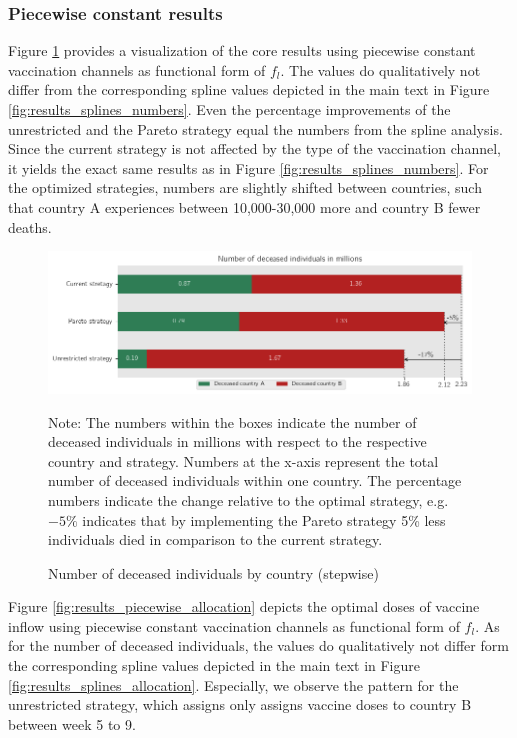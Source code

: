 \subsubsection{Piecewise constant results}
\label{A:piecewise}
Figure \ref{fig:results_piecewise_numbers} provides a visualization of the core results using piecewise constant vaccination channels as functional form of $f_l$. The values do qualitatively not differ from the corresponding spline values depicted in the main text in Figure \ref{fig:results_splines_numbers}. Even the percentage improvements of the unrestricted and the Pareto strategy equal the numbers from the spline analysis. Since the current strategy is not affected by the type of the vaccination channel, it yields the exact same results as in Figure \ref{fig:results_splines_numbers}. For the optimized strategies, numbers are slightly shifted between countries, such that country A experiences between 10,000-30,000 more and country B fewer deaths. 
\begin{figure}[h!]
\centering
\includegraphics[scale=0.65]{images/piecewise_percentage_deviation.png}
\begin{flushleft}
\scriptsize{Note: The numbers within the boxes indicate the number of deceased individuals in millions with respect to the respective country and strategy. Numbers at the x-axis represent the total number of deceased individuals within one country. The percentage numbers indicate the change relative to the optimal strategy, e.g. $-5\%$ indicates that by implementing the Pareto strategy 5\% less individuals died in comparison to the current strategy.}
\end{flushleft}
\caption{Number of deceased individuals by country (stepwise)}
\label{fig:results_piecewise_numbers}
\end{figure}
Figure \ref{fig:results_piecewise_allocation} depicts the optimal doses of vaccine inflow using piecewise constant vaccination channels as functional form of $f_l$. As for the number of deceased individuals, the values do qualitatively not differ form the corresponding spline values depicted in the main text in Figure \ref{fig:results_splines_allocation}. Especially, we observe the pattern for the unrestricted strategy, which assigns only assigns vaccine doses to country B between week 5 to 9. %

